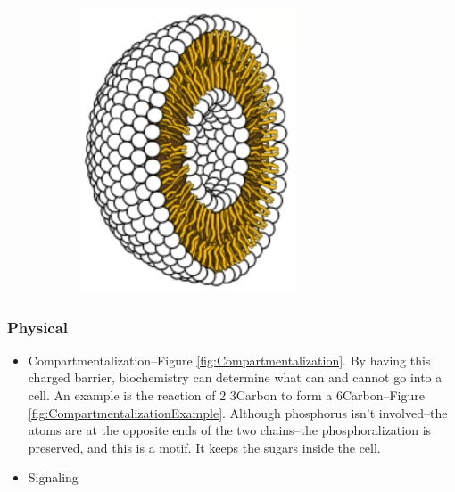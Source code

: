 \documentclass[]{article}
\begin{document}
\begin{figure}[H]
\begin{subfigure}[t]{0.3\textwidth}
		\includegraphics[width=\textwidth]{PhosphoLipid3}
	\end{subfigure}
	
\end{figure}

\subsubsection{Physical}

\begin{itemize}
	\item Compartmentalization--Figure \ref{fig:Compartmentalization}. By having this charged barrier, biochemistry can determine what can and cannot go into a cell. An example is the reaction of 2 3Carbon to form a 6Carbon--Figure \ref{fig:CompartmentalizationExample}. Although phosphorus isn't involved--the atoms are at the opposite ends of the two chains--the phosphoralization is preserved, and this is a motif. It keeps the sugars inside the cell.
	\item Signaling
\end{itemize}
\end{document}
